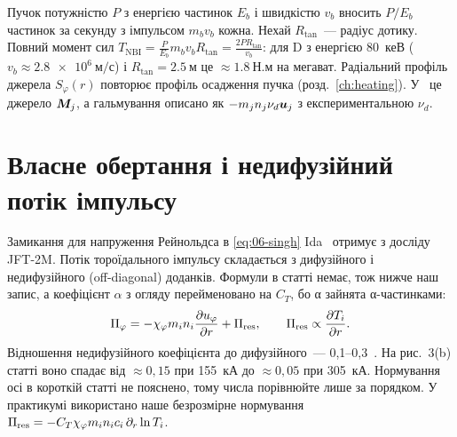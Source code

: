 \begin{outofcorpus}
Пучок потужністю $P$ з енергією частинок $E_b$ і швидкістю $v_b$ вносить $P/E_b$ частинок за секунду з імпульсом $m_bv_b$ кожна. Нехай $R_{\tan}$~--- радіус дотику. Повний момент сил $T_{\mathrm{NBI}}=\frac{P}{E_b}m_bv_bR_{\tan}=\frac{2PR_{\tan}}{v_b}$: для D з енергією \SI{80}{кеВ} ($v_b\approx\SI{2,8e6}{м/с}$) і $R_{\tan}=\SI{2,5}{м}$ це $\approx\SI{1,8}{Н.м}$ на мегават. Радіальний профіль джерела $S_\varphi(r)$ повторює профіль осадження пучка (розд.~\ref{ch:heating}). У~\cite{Sigmar1987} це джерело $\bm{M}_j$, а гальмування описано як $-m_jn_j\nu_d\bm{u}_j$ з експериментальною $\nu_d$.
\end{outofcorpus}

\section{Власне обертання і недифузійний потік імпульсу}\label{sec:06-intrinsic}

Замикання для напруження Рейнольдса в \eqref{eq:06-singh} Ida~\cite{Ida2001} отримує з досліду JFT-2M. Потік тороїдального імпульсу складається з дифузійного і недифузійного (off-diagonal) доданків. Формули в статті немає, тож нижче наш запис, а коефіцієнт $\alpha$ з огляду перейменовано на $C_T$, бо α зайнята α-частинками:
\begin{equation}\label{eq:06-Pi}
  \Pi_{\varphi}=-\chi_{\varphi}m_in_i\frac{\partial u_{\varphi}}{\partial r}+\Pi_{\mathrm{res}},\qquad \Pi_{\mathrm{res}}\propto\frac{\partial T_i}{\partial r}.
\end{equation}
Відношення недифузійного коефіцієнта до дифузійного~--- 0,1--0,3~\cite[с.~3--5]{Ida2001}. На рис.~3(b) статті воно спадає від $\approx0{,}15$ при \SI{155}{кА} до $\approx0{,}05$ при \SI{305}{кА}. Нормування осі в короткій статті не пояснено, тому числа порівнюйте лише за порядком. У практикумі використано наше безрозмірне нормування $\Pi_{\mathrm{res}}=-C_T\chi_{\varphi}m_in_ic_i\,\partial_r\ln T_i$.

